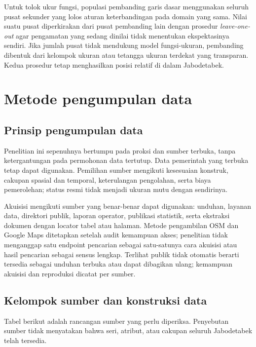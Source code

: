 \documentclass[11pt,a4paper,oneside,openany,indonesian]{report}
\begin{document}
Untuk tolok ukur fungsi, populasi pembanding garis dasar menggunakan
seluruh pusat sekunder yang lolos aturan keterbandingan pada domain yang
sama. Nilai suatu pusat diperkirakan dari pusat pembanding lain dengan
prosedur \emph{leave-one-out} agar pengamatan yang sedang dinilai tidak
menentukan ekspektasinya sendiri. Jika jumlah pusat tidak mendukung model
fungsi-ukuran, pembanding dibentuk dari kelompok ukuran atau tetangga
ukuran terdekat yang transparan. Kedua prosedur tetap menghasilkan
posisi relatif di dalam Jabodetabek.

\section{Metode pengumpulan data}\label{metode-pengumpulan-data}

\subsection{Prinsip pengumpulan
data}\label{prinsip-pengumpulan-data}

Penelitian ini sepenuhnya bertumpu pada proksi dan sumber terbuka, tanpa
ketergantungan pada permohonan data tertutup. Data pemerintah yang
terbuka tetap dapat digunakan. Pemilihan sumber mengikuti kesesuaian
konstruk, cakupan spasial dan temporal, keterulangan pengolahan, serta
biaya pemerolehan; status resmi tidak menjadi ukuran mutu dengan
sendirinya.

Akuisisi mengikuti sumber yang benar-benar dapat digunakan: unduhan,
layanan data, direktori publik, laporan operator, publikasi statistik,
serta ekstraksi dokumen dengan locator tabel atau halaman. Metode
pengambilan OSM dan Google Maps ditetapkan setelah audit kemampuan
akses; penelitian tidak menganggap satu endpoint pencarian sebagai
satu-satunya cara akuisisi atau hasil pencarian sebagai sensus lengkap.
Terlihat publik tidak otomatis berarti tersedia sebagai unduhan terbuka
atau dapat dibagikan ulang; kemampuan akuisisi dan reproduksi dicatat
per sumber.

\subsection{Kelompok sumber dan konstruksi
data}\label{kelompok-sumber-dan-konstruksi-data}

Tabel berikut adalah rancangan sumber yang perlu diperiksa. Penyebutan
sumber tidak menyatakan bahwa seri, atribut, atau cakupan seluruh
Jabodetabek telah tersedia.
\end{document}
